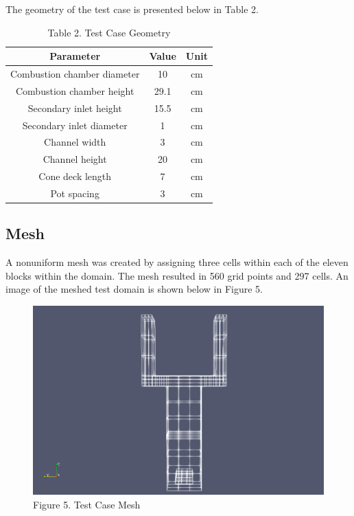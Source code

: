 \documentclass[3p,times,twocolumn]{elsarticle}
\begin{document}
The geometry of the test case is presented below in Table 2.

\begin{table}{\linewidth}
	\centering
	\begin{tabular}{||c c c||}
		\hline
		Parameter & Value & Unit \\ [0.4ex]
		\hline\hline
		Combustion chamber diameter & 10 & cm \\
		Combustion chamber height & 29.1 & cm \\
		Secondary inlet height & 15.5 & cm \\
		Secondary inlet diameter & 1 & cm \\
		Channel width & 3 & cm \\
		Channel height & 20 & cm \\
		Cone deck length & 7 & cm \\
		Pot spacing & 3 & cm \\
		\hline
	\end{tabular}
	\caption{Table 2. Test Case Geometry}
\end{table}


\subsection{Mesh}
A nonuniform mesh was created by assigning three cells within each of the eleven blocks within the domain. The mesh resulted in 560 grid points and 297 cells. An image of the meshed test domain is shown below in Figure 5.

\begin{figure}{\linewidth}
	\includegraphics[width=\linewidth]{mesh.PNG}
	\caption{Figure 5. Test Case Mesh}
\end{figure}
\end{document}
